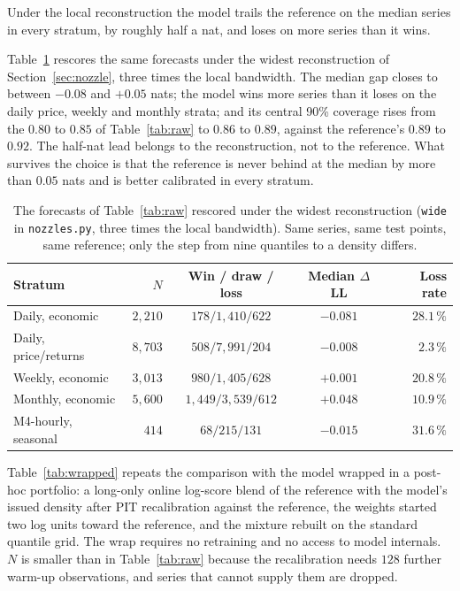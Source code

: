 \documentclass[article]{jss}
\providecommand{\code}[1]{\texttt{#1}}
\begin{document}
Under the local reconstruction the model trails the reference on the median
series in every stratum, by roughly half a nat, and loses on more series than
it wins.

Table~\ref{tab:wide} rescores the same forecasts under the widest
reconstruction of Section~\ref{sec:nozzle}, three times the local bandwidth.
The median gap closes to between $-0.08$ and $+0.05$ nats; the model wins more
series than it loses on the daily price, weekly and monthly strata; and its
central 90\%
coverage rises from the $0.80$ to $0.85$ of Table~\ref{tab:raw} to $0.86$ to
$0.89$, against the reference's $0.89$ to $0.92$. The half-nat lead belongs to
the reconstruction, not to the reference. What survives the choice is that the
reference is never behind at the median by more than $0.05$ nats and is better
calibrated in every stratum.

\begin{table}[t!]
\centering
\begin{tabular}{lrccr}
\toprule
Stratum & $N$ & Win / draw / loss & Median $\Delta$LL & Loss rate \\
\midrule
Daily, economic       & $2{,}210$ & $178 / 1{,}410 / 622$ & $-0.081$ & $28.1\,\%$ \\
Daily, price/returns  & $8{,}703$ & $508 / 7{,}991 / 204$ & $-0.008$ & $2.3\,\%$ \\
Weekly, economic      & $3{,}013$ & $980 / 1{,}405 / 628$ & $+0.001$ & $20.8\,\%$ \\
Monthly, economic     & $5{,}600$ & $1{,}449 / 3{,}539 / 612$ & $+0.048$ & $10.9\,\%$ \\
M4-hourly, seasonal   & $414$ & $68 / 215 / 131$ & $-0.015$ & $31.6\,\%$ \\
\bottomrule
\end{tabular}
\caption{The forecasts of Table~\ref{tab:raw} rescored under the widest
reconstruction (\code{wide} in \code{nozzles.py}, three times the local
bandwidth). Same series, same test points, same reference; only the step from
nine quantiles to a density differs.}
\label{tab:wide}
\end{table}

Table~\ref{tab:wrapped} repeats the comparison with the model wrapped in a
post-hoc portfolio: a long-only online log-score blend of the reference with
the model's issued density after PIT recalibration against the reference, the
weights started two log units toward the reference, and the mixture rebuilt on
the standard quantile grid. The wrap requires no retraining and no access to
model internals. $N$ is smaller than in Table~\ref{tab:raw} because the
recalibration needs $128$ further warm-up observations, and series that cannot
supply them are dropped.
\end{document}
